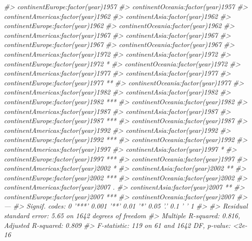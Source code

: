 \documentclass[]{book}
\newenvironment{Shaded}{\begin{snugshade}}{\end{snugshade}}
\newcommand{\CommentTok}[1]{\textcolor[rgb]{0.56,0.35,0.01}{\textit{#1}}}
\begin{document}
\begin{Shaded}
\begin{Highlighting}[]
\CommentTok{#> continentEurope:factor(year)1957      }
\CommentTok{#> continentOceania:factor(year)1957     }
\CommentTok{#> continentAmericas:factor(year)1962    }
\CommentTok{#> continentAsia:factor(year)1962        }
\CommentTok{#> continentEurope:factor(year)1962      }
\CommentTok{#> continentOceania:factor(year)1962     }
\CommentTok{#> continentAmericas:factor(year)1967    }
\CommentTok{#> continentAsia:factor(year)1967        }
\CommentTok{#> continentEurope:factor(year)1967      }
\CommentTok{#> continentOceania:factor(year)1967     }
\CommentTok{#> continentAmericas:factor(year)1972    }
\CommentTok{#> continentAsia:factor(year)1972        }
\CommentTok{#> continentEurope:factor(year)1972   *  }
\CommentTok{#> continentOceania:factor(year)1972     }
\CommentTok{#> continentAmericas:factor(year)1977    }
\CommentTok{#> continentAsia:factor(year)1977        }
\CommentTok{#> continentEurope:factor(year)1977   ** }
\CommentTok{#> continentOceania:factor(year)1977     }
\CommentTok{#> continentAmericas:factor(year)1982    }
\CommentTok{#> continentAsia:factor(year)1982        }
\CommentTok{#> continentEurope:factor(year)1982   ***}
\CommentTok{#> continentOceania:factor(year)1982     }
\CommentTok{#> continentAmericas:factor(year)1987    }
\CommentTok{#> continentAsia:factor(year)1987        }
\CommentTok{#> continentEurope:factor(year)1987   ***}
\CommentTok{#> continentOceania:factor(year)1987     }
\CommentTok{#> continentAmericas:factor(year)1992    }
\CommentTok{#> continentAsia:factor(year)1992        }
\CommentTok{#> continentEurope:factor(year)1992   ***}
\CommentTok{#> continentOceania:factor(year)1992     }
\CommentTok{#> continentAmericas:factor(year)1997    }
\CommentTok{#> continentAsia:factor(year)1997     *  }
\CommentTok{#> continentEurope:factor(year)1997   ***}
\CommentTok{#> continentOceania:factor(year)1997     }
\CommentTok{#> continentAmericas:factor(year)2002 *  }
\CommentTok{#> continentAsia:factor(year)2002     ** }
\CommentTok{#> continentEurope:factor(year)2002   ***}
\CommentTok{#> continentOceania:factor(year)2002     }
\CommentTok{#> continentAmericas:factor(year)2007 .  }
\CommentTok{#> continentAsia:factor(year)2007     ** }
\CommentTok{#> continentEurope:factor(year)2007   ***}
\CommentTok{#> continentOceania:factor(year)2007     }
\CommentTok{#> ---}
\CommentTok{#> Signif. codes:  0 '***' 0.001 '**' 0.01 '*' 0.05 '.' 0.1 ' ' 1}
\CommentTok{#> }
\CommentTok{#> Residual standard error: 5.65 on 1642 degrees of freedom}
\CommentTok{#> Multiple R-squared:  0.816,  Adjusted R-squared:  0.809 }
\CommentTok{#> F-statistic:  119 on 61 and 1642 DF,  p-value: <2e-16}
\end{Highlighting}
\end{Shaded}
\end{document}
